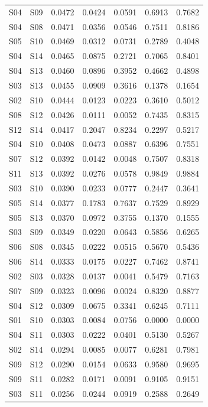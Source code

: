 \begin{table}
\begin{tabular}{llrrrrr}
S04 & S09 & 0.0472 & 0.0424 & 0.0591 & 0.6913 & 0.7682 \\
S04 & S08 & 0.0471 & 0.0356 & 0.0546 & 0.7511 & 0.8186 \\
S05 & S10 & 0.0469 & 0.0312 & 0.0731 & 0.2789 & 0.4048 \\
S04 & S14 & 0.0465 & 0.0875 & 0.2721 & 0.7065 & 0.8401 \\
S04 & S13 & 0.0460 & 0.0896 & 0.3952 & 0.4662 & 0.4898 \\
S03 & S13 & 0.0455 & 0.0909 & 0.3616 & 0.1378 & 0.1654 \\
S02 & S10 & 0.0444 & 0.0123 & 0.0223 & 0.3610 & 0.5012 \\
S08 & S12 & 0.0426 & 0.0111 & 0.0052 & 0.7435 & 0.8315 \\
S12 & S14 & 0.0417 & 0.2047 & 0.8234 & 0.2297 & 0.5217 \\
S04 & S10 & 0.0408 & 0.0473 & 0.0887 & 0.6396 & 0.7551 \\
S07 & S12 & 0.0392 & 0.0142 & 0.0048 & 0.7507 & 0.8318 \\
S11 & S13 & 0.0392 & 0.0276 & 0.0578 & 0.9849 & 0.9884 \\
S03 & S10 & 0.0390 & 0.0233 & 0.0777 & 0.2447 & 0.3641 \\
S05 & S14 & 0.0377 & 0.1783 & 0.7637 & 0.7529 & 0.8929 \\
S05 & S13 & 0.0370 & 0.0972 & 0.3755 & 0.1370 & 0.1555 \\
S03 & S09 & 0.0349 & 0.0220 & 0.0643 & 0.5856 & 0.6265 \\
S06 & S08 & 0.0345 & 0.0222 & 0.0515 & 0.5670 & 0.5436 \\
S06 & S14 & 0.0333 & 0.0175 & 0.0227 & 0.7462 & 0.8741 \\
S02 & S03 & 0.0328 & 0.0137 & 0.0041 & 0.5479 & 0.7163 \\
S07 & S09 & 0.0323 & 0.0096 & 0.0024 & 0.8320 & 0.8877 \\
S04 & S12 & 0.0309 & 0.0675 & 0.3341 & 0.6245 & 0.7111 \\
S01 & S10 & 0.0303 & 0.0084 & 0.0756 & 0.0000 & 0.0000 \\
S04 & S11 & 0.0303 & 0.0222 & 0.0401 & 0.5130 & 0.5267 \\
S02 & S14 & 0.0294 & 0.0085 & 0.0077 & 0.6281 & 0.7981 \\
S09 & S12 & 0.0290 & 0.0154 & 0.0633 & 0.9580 & 0.9695 \\
S09 & S11 & 0.0282 & 0.0171 & 0.0091 & 0.9105 & 0.9151 \\
S03 & S11 & 0.0256 & 0.0244 & 0.0919 & 0.2588 & 0.2649 \\

\end{tabular}
\end{table}
